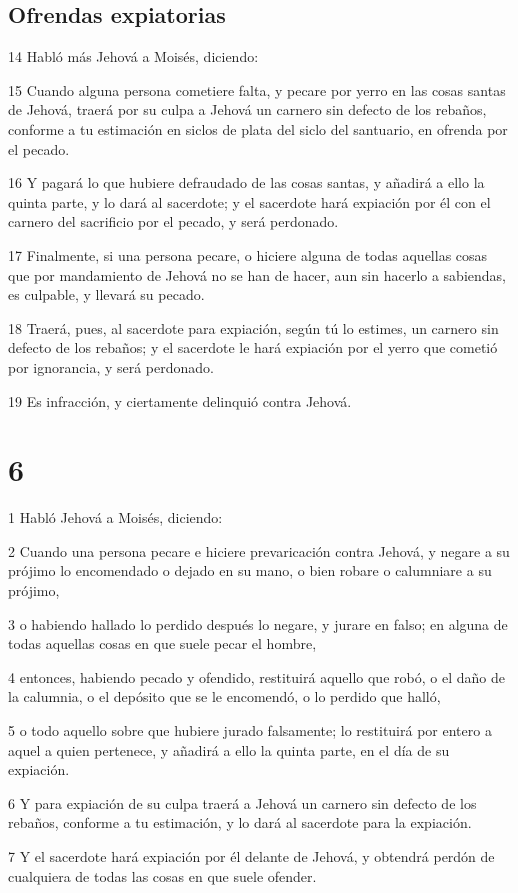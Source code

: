 \section*{Ofrendas expiatorias}

\par 14 Habló más Jehová a Moisés, diciendo:
\par 15 Cuando alguna persona cometiere falta, y pecare por yerro en las cosas santas de Jehová, traerá por su culpa a Jehová un carnero sin defecto de los rebaños, conforme a tu estimación en siclos de plata   del siclo del santuario, en ofrenda por el pecado.
\par 16 Y pagará lo que hubiere defraudado de las cosas santas, y añadirá a ello la quinta parte, y lo dará al sacerdote; y el sacerdote hará expiación por él con el carnero del sacrificio por el pecado, y será perdonado.
\par 17 Finalmente, si una persona pecare, o hiciere alguna de todas aquellas cosas que por mandamiento de Jehová no se han de hacer, aun sin hacerlo a sabiendas, es culpable, y llevará su pecado.
\par 18 Traerá, pues, al sacerdote para expiación, según tú lo estimes, un carnero sin defecto de los rebaños; y el sacerdote le hará expiación por el yerro que cometió por ignorancia, y será perdonado.
\par 19 Es infracción, y ciertamente delinquió contra Jehová.

\chapter{6}

\par 1 Habló Jehová a Moisés, diciendo:
\par 2 Cuando una persona pecare e hiciere prevaricación contra Jehová, y negare a su prójimo lo encomendado o dejado en su mano, o bien robare o calumniare a su prójimo,
\par 3 o habiendo hallado lo perdido después lo negare, y jurare en falso; en alguna de todas aquellas cosas en que suele pecar el hombre,
\par 4 entonces, habiendo pecado y ofendido, restituirá aquello que robó, o el daño de la calumnia, o el depósito que se le encomendó, o lo perdido que halló,
\par 5 o todo aquello sobre que hubiere jurado falsamente; lo restituirá por entero a aquel a quien pertenece, y añadirá a ello la quinta parte, en el día de su expiación.
\par 6 Y para expiación de su culpa traerá a Jehová un carnero sin defecto de los rebaños, conforme a tu estimación, y lo dará al sacerdote para la expiación.
\par 7 Y el sacerdote hará expiación por él delante de Jehová, y obtendrá perdón de cualquiera de todas las cosas en que suele ofender.

